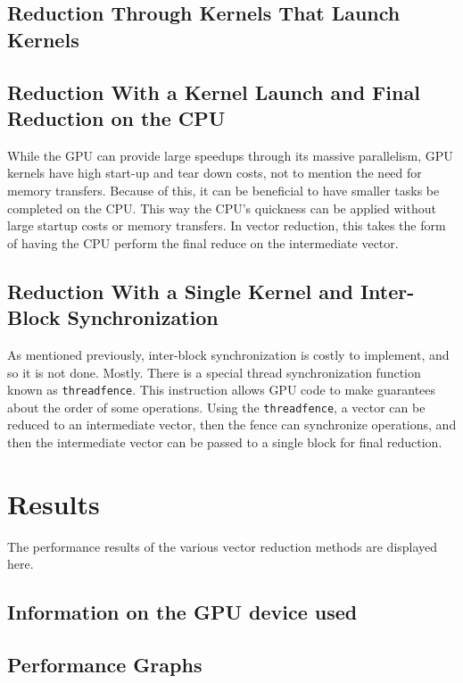 \documentclass{article}
\begin{document}
\subsection{Reduction Through Kernels That Launch Kernels}






\subsection{Reduction With a Kernel Launch and Final Reduction on the CPU}
While the GPU can provide large speedups through its massive parallelism, GPU kernels have high start-up and tear down costs, not to mention the need for memory transfers. Because of this, it can be beneficial to have smaller tasks be completed on the CPU. This way the CPU's quickness can be applied without large startup costs or memory transfers. In vector reduction, this takes the form of having the CPU perform the final reduce on the intermediate vector.

\subsection{Reduction With a Single Kernel and Inter-Block Synchronization}
As mentioned previously, inter-block synchronization is costly to implement, and so it is not done. Mostly. There is a special thread synchronization function known as \texttt{threadfence}. This instruction allows GPU code to make guarantees about the order of some operations. Using the \texttt{threadfence}, a vector can be reduced to an intermediate vector, then the fence can synchronize operations, and then the intermediate vector can be passed to a single block for final reduction. 

\newpage
\section{Results}
The performance results of the various vector reduction methods are displayed here.

\subsection{Information on the GPU device used}

\newpage
\subsection{Performance Graphs}
\end{document}
